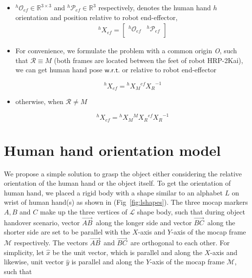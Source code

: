 \begin{itemize}
	\item ${{}^{h}\mathcal{O}_{ef}} \in \mathbb{R}^{3\times3}$ and ${{}^{h}\mathcal{P}_{ef}} \in \mathbb{R}^{3}$ respectively, denotes the human hand $h$ orientation and position relative to robot end-effector,
	\begin{gather}\label{X_ef_h}
	{}^{h}{X}_{ef} =
	\left[\begin{array}{cc}
	{}^{h}\mathcal{O}_{ef} & {}^{h}\mathcal{P}_{ef} \\
	\end{array}\right]
	\end{gather}
	
	\item For convenience, we formulate the problem with a common origin {\it O}, such that $\mathcal R \equiv M$ (both frames are located between the feet of robot HRP-2Kai), we can get human hand pose $\mathsf{w.r.t.}$ or relative to robot end-effector
	
	\begin{equation}\label{X_ef_h1}
	{}^{h}{X}_{ef} = {}^{h}{X}_{M}  {}^{ef}{X_{R}}^{-1}
	\end{equation}
	\item otherwise, when $\mathcal R \neq M$
	
	\begin{equation}\label{X_ef_h2}
	{}^{h}{X}_{ef} = {}^{h}{X}_{M}  {}^{M}{X}_R  {}^{ef}{X_{R}}^{-1}
	\end{equation}
	
\end{itemize}


\section{Human hand orientation model}\label{hand_orientation}

We propose a simple solution to grasp the object either considering the relative orientation of the human hand or the object itself. To get the orientation of human hand, we placed a rigid body with a shape similar to an alphabet $L$ on wrist of human hand(s) as shown in (Fig~\ref{fig:lshapes}). The three mocap markers $A, B$ and $C$ make up the three vertices of $\mathcal{L}$ shape body, such that during object handover scenario, vector $\vec{AB}^{\,}$ along the longer side and vector $\vec{BC}^{\,}$ along the shorter side are set to be parallel with the $X$-axis and $Y$-axis of the mocap frame $\mathcal{M}$ respectively. The vectors $\vec{AB}^{\,}$ and $\vec{BC}^{\,}$ are orthogonal to each other. For simplicity, let $\hat{x}$ be the unit vector, which is parallel and along the $X$-axis and likewise, unit vector $\hat{y}$ is parallel and along the $Y$-axis of the mocap frame $\mathcal{M}$, such that

